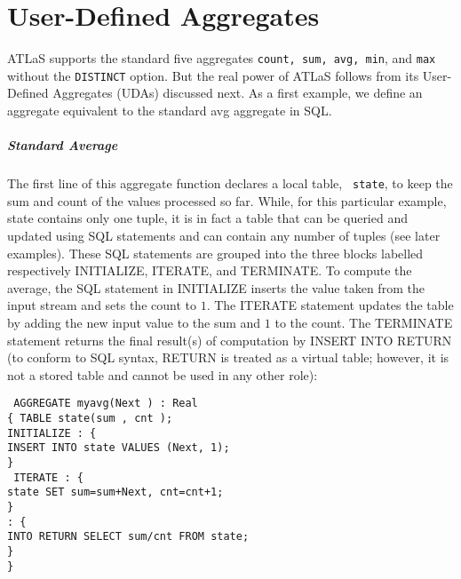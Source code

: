 \chapter{User-Defined Aggregates}
ATLaS supports the standard five aggregates {\tt count, sum,
avg, min}, and {\tt max} without the {\tt DISTINCT} option.
But the real power of ATLaS follows from its User-Defined Aggregates
(UDAs) discussed next.
As a first example, we define an aggregate equivalent to the standard
{\bw avg} aggregate in SQL.
\paragraph{Standard Average} The first
line of this aggregate function declares a local table, {\tt
state}, to keep the sum and count of the values processed so far.
While, for this particular example, {\bw state} contains only one
tuple, it is in fact a table that can be queried and updated using
SQL statements and can contain any number of tuples (see later
examples). These SQL statements are grouped into the three blocks
labelled respectively {\cw INITIALIZE}, {\cw ITERATE}, and {\cw
TERMINATE}. To compute the average, the SQL statement in
{\cw INITIALIZE} inserts the value taken from
the input stream and sets the count to $1$. The {\cw ITERATE}
statement updates the table by adding the new input value to the
sum and $1$ to the count. The {\cw TERMINATE} statement returns
the final result(s) of computation by {\cw INSERT INTO RETURN} (to
conform to SQL syntax, {\cw RETURN} is treated as a virtual table;
however, it is not a stored table and cannot be
used in any other role): \\

\begin{codedisplay}
\tt
\> AGGREGATE myavg(Next ) : Real\\
\>\{\> {TABLE} state(sum , cnt ); \\
\>\> {INITIALIZE} : \{\\
\>\>\>INSERT INTO state {VALUES} (Next, 1);\\
\>\>\}\\
\>\>\ {ITERATE} : \{\\
\>\> state {SET} sum=sum+Next, cnt=cnt+1;\\
\>\>\}\\
\> : \{\\
\>\> {INTO} {RETURN} {SELECT} sum/cnt {FROM} state;\\
\>\>\}\> \\
\>\}\\
\end{codedisplay}

